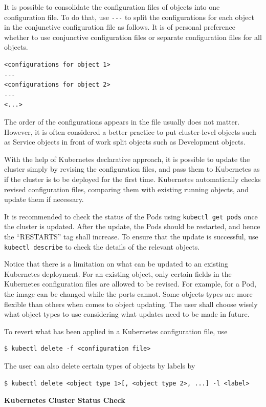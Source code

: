 It is possible to consolidate the configuration files of objects into one configuration file. To do that, use \verb|---| to split the configurations for each object in the conjunctive configuration file as follows. It is of personal preference whether to use conjunctive configuration files or separate configuration files for all objects.
\begin{lstlisting}
<configurations for object 1>
---
<configurations for object 2>
---
<...>
\end{lstlisting}
The order of the configurations appears in the file usually does not matter. However, it is often considered a better practice to put cluster-level objects such as Service objects in front of work split objects such as Development objects.

With the help of Kubernetes declarative approach, it is possible to update the cluster simply by revising the configuration files, and pass them to Kubernetes as if the cluster is to be deployed for the first time. Kubernetes automatically checks revised configuration files, comparing them with existing running objects, and update them if necessary.

It is recommended to check the status of the Pods using \verb|kubectl get pods| once the cluster is updated. After the update, the Pods should be restarted, and hence the ``RESTARTS'' tag shall increase. To ensure that the update is successful, use \verb|kubectl describe| to check the details of the relevant objects.

Notice that there is a limitation on what can be updated to an existing Kubernetes deployment. For an existing object, only certain fields in the Kubernetes configuration files are allowed to be revised. For example, for a Pod, the image can be changed while the ports cannot. Some objects types are more flexible than others when comes to object updating. The user shall choose wisely what object types to use considering what updates need to be made in future.

To revert what has been applied in a Kubernetes configuration file, use
\begin{lstlisting}
$ kubectl delete -f <configuration file>
\end{lstlisting}
The user can also delete certain types of objects by labels by
\begin{lstlisting}
$ kubectl delete <object type 1>[, <object type 2>, ...] -l <label>
\end{lstlisting}

\vspace{0.1in}
\noindent \textbf{Kubernetes Cluster Status Check}
\vspace{0.1in}

